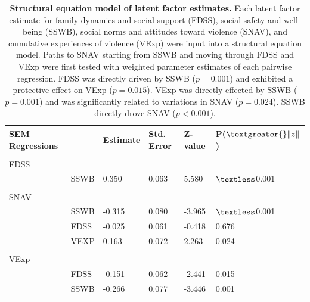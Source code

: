 \documentclass[utf8]{article}
\begin{document}
\begin{table}[h!]
\begin{tabular}{llllll}
SEM Regressions &      & Estimate & Std. Error & Z-value & P($\textgreater{}\|z\|$) \\ \hline
                           &          &            &         &                          \\
FDSS                      &          &            &         &                          \\
& SSWB & 0.350   & 0.063      & 5.580  & $\textless$0.001 \\ \hline \\
SNAV                      &          &            &         &                          \\
& SSWB & -0.315   & 0.080      & -3.965  & $\textless$0.001 \\ 
& FDSS & -0.025   & 0.061      & -0.418  & 0.676 \\ 
& VEXP & 0.163   & 0.072      & 2.263  & 0.024 \\  \hline \\
VExp                      &          &            &         &                          \\
& FDSS & -0.151   & 0.062      & -2.441  & 0.015 \\ 
& SSWB & -0.266   & 0.077      & -3.446  & 0.001 \\ 
\end{tabular}
\caption{\textbf{Structural equation model of latent factor estimates.} Each latent factor estimate for family dynamics and social support (FDSS), social safety and well-being (SSWB), social norms and attitudes toward violence (SNAV), and cumulative experiences of violence (VExp) were input into a structural equation model. Paths to SNAV starting from SSWB and moving through FDSS and VExp were first tested with weighted parameter estimates of each pairwise regression. FDSS was directly driven by SSWB ($p=0.001$) and exhibited a protective effect on VExp ($p=0.015$). VExp was directly effected by SSWB ($p=0.001$) and was significantly related to variations in SNAV ($p=0.024$). SSWB directly drove SNAV ($p<0.001$). \label{tab:11}}
\end{table}
\end{document}
